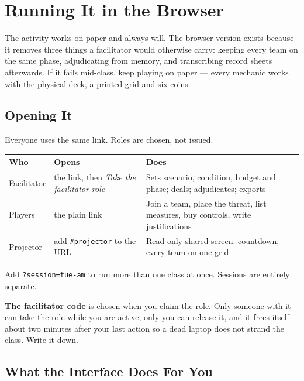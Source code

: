 \section{Running It in the Browser}
\label{sec:web}

The activity works on paper and always will. The browser version exists because
it removes three things a facilitator would otherwise carry: keeping every team
on the same phase, adjudicating from memory, and transcribing record sheets
afterwards. If it fails mid-class, keep playing on paper --- every mechanic works
with the physical deck, a printed grid and six coins.

\subsection{Opening It}

Everyone uses the same link. Roles are chosen, not issued.

\begin{center}
\small
\begin{tabularx}{\textwidth}{@{}l l X@{}}
\toprule
\textbf{Who} & \textbf{Opens} & \textbf{Does} \\
\midrule
Facilitator & the link, then \emph{Take the facilitator role} &
Sets scenario, condition, budget and phase; deals; adjudicates; exports \\
Players & the plain link & Join a team, place the threat, list measures, buy
controls, write justifications \\
Projector & add \texttt{\#projector} to the URL &
Read-only shared screen: countdown, every team on one grid \\
\bottomrule
\end{tabularx}
\end{center}

Add \texttt{?session=tue-am} to run more than one class at once. Sessions are
entirely separate.

\textbf{The facilitator code} is chosen when you claim the role. Only someone
with it can take the role while you are active, only you can release it, and it
frees itself about two minutes after your last action so a dead laptop does not
strand the class. Write it down.

\subsection{What the Interface Does For You}

